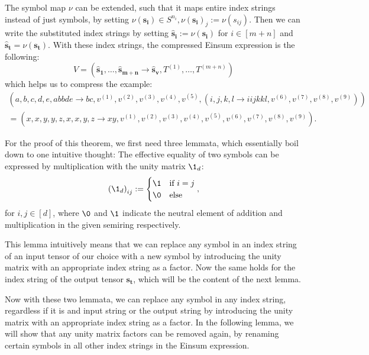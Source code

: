 \begin{theorem}
    The symbol map $\nu$ can be extended, such that it maps entire index strings instead of just symbols, by setting $\nu(\bm{s_i}) \in S^{n_i}, \nu(\bm{s_i})_j := \nu(s_{ij})$.
    Then we can write the substituted index strings by setting $\bm{\hat{s}_i} := \nu(\bm{s_i})$ for $i \in [m + n]$ and $\bm{\hat{s}_t} = \nu(\bm{s_t})$.
    With these index strings, the compressed Einsum expression is the following:
    $$V = (\bm{\hat{s}_1}, \dots, \bm{\hat{s}_{m + n}} \rightarrow \bm{\hat{s}_v}, T^{(1)},\dots,T^{(m + n)})$$
    which helps us to compress the example:
    \begin{gather*}
        (a,b,c,d,e,abbde \rightarrow bc, v^{(1)}, v^{(2)}, v^{(3)}, v^{(4)}, v^{(5)}, (
        i,j,k,l \rightarrow iijkkl, v^{(6)}, v^{(7)}, v^{(8)}, v^{(9)}
        ))\\
        =(x,x,y,y,z,x,x,y,z \rightarrow xy, v^{(1)}, v^{(2)}, v^{(3)}, v^{(4)}, v^{(5)}, v^{(6)}, v^{(7)}, v^{(8)}, v^{(9)}).
    \end{gather*}
\end{theorem}

\bigskip
For the proof of this theorem, we first need three lemmata, which essentially boil down to one intuitive thought:
The effective equality of two symbols can be expressed by multiplication with the unity matrix $\1_d$:
$$\left(\1_d\right)_{ij} := \begin{cases}
        \1 & \text{if $i = j$} \\
        \0 & \text{else}
    \end{cases},$$
for $i,j \in [d]$, where $\0$ and $\1$ indicate the neutral element of addition and multiplication in the given semiring respectively.



This lemma intuitively means that we can replace any symbol in an index string of an input tensor of our choice with a new symbol by introducing the unity matrix with an appropriate index string as a factor.
Now the same holds for the index string of the output tensor $\bm{s_t}$, which will be the content of the next lemma.



Now with these two lemmata, we can replace any symbol in any index string, regardless if it is and input string or the output string by introducing the unity matrix with an appropriate index string as a factor.
In the following lemma, we will show that any unity matrix factors can be removed again, by renaming certain symbols in all other index strings in the Einsum expression.

